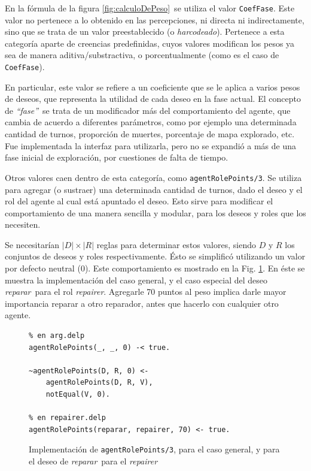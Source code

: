 \documentclass[oneside]{book}
\theoremstyle{definition}
\theoremstyle{example}
\begin{document}
En la fórmula de la figura \ref{fig:calculoDePeso}\ se utiliza el valor 
\texttt{CoefFase}. Este valor no pertenece a lo obtenido en las percepciones, ni
directa ni indirectamente, sino que se trata de un valor preestablecido (o
\textit{harcodeado}). Pertenece a esta categoría aparte de creencias predefinidas,
cuyos valores modifican los pesos ya sea de manera aditiva/substractiva, o 
porcentualmente (como es el caso de \texttt{CoefFase}).

En particular, este valor se refiere a un coeficiente que se le aplica a varios
pesos de deseos, que representa la utilidad de cada deseo en la fase actual. El 
concepto de \textit{``fase''}\ se trata de un modificador más del comportamiento
del agente, que cambia de acuerdo a diferentes parámetros, como por ejemplo una
determinada cantidad de turnos, proporción de muertes, porcentaje de mapa explorado,
etc. Fue implementada la interfaz para utilizarla, pero no se expandió a más de una
fase inicial de exploración, por cuestiones de falta de tiempo.

Otros valores caen dentro de esta categoría, como \texttt{agentRolePoints/3}.
Se utiliza para agregar (o sustraer) una determinada cantidad de turnos, dado el
deseo y el rol del agente al cual está apuntado el deseo. Esto sirve para modificar el 
comportamiento de una manera sencilla y modular, para los deseos y roles que los 
necesiten.

Se necesitarían $|D| \times |R|$ reglas para determinar estos valores, siendo $D$
y $R$ los conjuntos de deseos y roles respectivamente. Ésto se simplificó utilizando
un valor por defecto neutral ($0$). Este comportamiento es mostrado
en la Fig. \ref{fig:agentRolePoints}. En éste se muestra la implementación del caso
general, y el caso especial del deseo \emph{reparar}\ para el rol \emph{repairer}.
Agregarle 70 puntos al peso implica darle mayor importancia reparar a otro reparador,
antes que hacerlo con cualquier otro agente.

\begin{figure}
\begin{verbatim}
% en arg.delp
agentRolePoints(_, _, 0) -< true.
	
~agentRolePoints(D, R, 0) <- 
	agentRolePoints(D, R, V),
	notEqual(V, 0).
    
% en repairer.delp
agentRolePoints(reparar, repairer, 70) <- true.
\end{verbatim}
\caption{Implementación de \texttt{agentRolePoints/3}, para el caso general, y para el 
deseo de \emph{reparar}\ para el \emph{repairer}}
\label{fig:agentRolePoints}
\end{figure}
\end{document}
